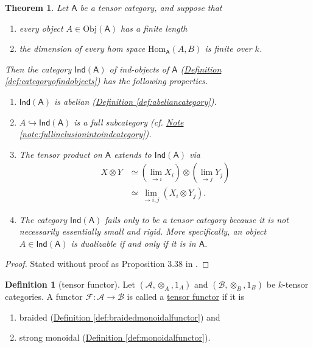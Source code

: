 \documentclass[a4paper,10pt]{scrreprt}
\newcommand{\defn}[1]{\ul{#1}}
\newcommand{\Obj}{\mathrm{Obj}}
\newcommand{\Hom}{\mathrm{Hom}}
\theoremstyle{definition}
\newtheorem{definition}{Definition}[section]
\theoremstyle{plain}
\newtheorem{theorem}{Theorem}[section]
\theoremstyle{remark}
\begin{document}
\begin{theorem}
  Let $\mathsf{A}$ be a tensor category, and suppose that
  \begin{enumerate}
    \item every object $A \in \Obj(\mathsf{A})$ has a finite length

    \item the dimension of every hom space $\Hom_{\mathsf{A}}(A, B)$ is finite over $k$.
  \end{enumerate}

  Then the category $\mathsf{Ind}(\mathsf{A})$ of ind-objects of $\mathsf{A}$ (\hyperref[def:categoryofindobjects]{Definition \ref*{def:categoryofindobjects}}) has the following properties.
  \begin{enumerate}
    \item $\mathsf{Ind}(\mathsf{A})$ is abelian (\hyperref[def:abeliancategory]{Definition \ref*{def:abeliancategory}}).

    \item $A \hookrightarrow \mathsf{Ind}(\mathsf{A})$ is a full subcategory (cf. \hyperref[note:fullinclusionintoindcategory]{Note \ref*{note:fullinclusionintoindcategory}}).

    \item The tensor product on $\mathsf{A}$ extends to $\mathsf{Ind}(\mathsf{A})$ via
      \begin{align*}
        X \otimes Y &\simeq (\lim_{\rightarrow i}X_{i}) \otimes (\lim_{\rightarrow j}Y_{j}) \\
        &\simeq \lim_{\rightarrow i,j} (X_{i} \otimes Y_{j}).
      \end{align*}

    \item The category $\mathsf{Ind}(\mathsf{A})$ fails only to be a tensor category because it is not necessarily essentially small and rigid. More specifically, an object $A \in \mathsf{Ind}(\mathsf{A})$ is dualizable if and only if it is in $\mathsf{A}$.
  \end{enumerate}
\end{theorem}
\begin{proof}
  Stated without proof as Proposition 3.38 in \cite{nlab-deligne-theorem}.
\end{proof}

\begin{definition}[tensor functor]
  \label{def:tensorfunctor}
  Let $(\mathscr{A}, \otimes_{A}, 1_{A})$ and $(\mathscr{B}, \otimes_{B}, 1_{B})$ be $k$-tensor categories. A functor $\mathcal{F}\colon \mathscr{A} \to \mathscr{B}$ is called a \defn{tensor functor} if it is
  \begin{enumerate}
    \item braided (\hyperref[def:braidedmonoidalfunctor]{Definition \ref*{def:braidedmonoidalfunctor}}) and
     
    \item strong monoidal (\hyperref[def:monoidalfunctor]{Definition \ref*{def:monoidalfunctor}}).
  \end{enumerate}
\end{definition}
\end{document}
